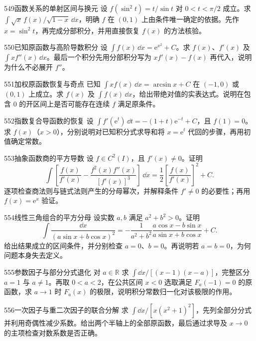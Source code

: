 \begin{exercise}{549}{函数关系的单射区间与换元}
设 $f(\sin^2t)=t/\sin t$ 对 $0<t<\pi/2$ 成立。求 $\int\sqrt x\,f(x)/\sqrt{1-x}\,\dd x$，明确 $f$ 在 $(0,1)$ 上由条件唯一确定的依据。先作 $x=\sin^2t$，再完成分部积分，并用直接恢复 $f(x)$ 的方法核验。
\end{exercise}
\begin{exercise}{550}{已知原函数与高阶导数积分}
设 $\int f(x)\,\dd x=\mathrm e^{x^2}+C$。求 $f(x)$、$f'(x)$ 及 $\int xf''(x)\,\dd x$。最后一个积分先用分部积分写为 $xf'(x)-f(x)$ 再代入，说明为什么不必展开 $f''$。
\end{exercise}
\begin{exercise}{551}{加权原函数恢复与奇点}
已知 $\int xf(x)\,\dd x=\arcsin x+C$ 在 $(-1,0)$ 或 $(0,1)$ 上成立。求 $f(x)$ 及 $\int f(x)\,\dd x$，给出带绝对值的实表达式。说明在包含 $0$ 的开区间上是否可能存在连续 $f$ 满足原条件。
\end{exercise}
\begin{exercise}{552}{指数复合导函数的恢复}
设 $\int f'(\mathrm e^t)\,\dd t=-(1+t)\mathrm e^{-t}+C$，且 $f(1)=0$。求 $f(x)$（$x>0$），分别说明对已知积分式求导和将 $x=\mathrm e^t$ 代回的步骤，再用初值确定常数。
\end{exercise}
\begin{exercise}{553}{抽象函数商的平方导数}
设 $f\in C^2(I)$，且 $f'(x)\ne0$。证明
\[\int\left[\frac{f(x)}{f'(x)}-\frac{f^2(x)f''(x)}{[f'(x)]^3}\right]\,\dd x=\frac12\left[\frac{f(x)}{f'(x)}\right]^2+C.\]
逐项检查商法则与链式法则产生的分母幂次，并解释条件 $f'\ne0$ 的必要性；再用 $f(x)=\mathrm e^x$ 验证。
\end{exercise}
\begin{exercise}{554}{线性三角组合的平方分母}
设实数 $a,b$ 满足 $a^2+b^2>0$。证明
\[\int\frac{\dd x}{(a\sin x+b\cos x)^2}=-\frac1{a^2+b^2}\frac{a\cos x-b\sin x}{a\sin x+b\cos x}+C.\]
给出结果成立的区间条件，并分别检查 $a=0$、$b=0$。再说明若 $a=b=0$，为何问题本身失去定义。
\end{exercise}
\begin{exercise}{555}{参数因子与部分分式退化}
对 $a\in\mathbb R$ 求 $\int\dd x/[(x-1)(x-a)]$，完整区分 $a=1$ 与 $a\ne1$。再取 $0<a<2$，在公共区间 $x<0$ 选取满足 $F_a(-1)=0$ 的原函数，求 $a\to1$ 时 $F_a(x)$ 的极限，说明积分常数归一化对该极限的作用。
\end{exercise}
\begin{exercise}{556}{一次因子与重二次因子的联合分解}
求 $\int\dd x/[x(x^2+1)^2]$，先列全部分分式并利用奇偶性减少系数。给出两个半轴上的全部原函数，最后通过求导及 $x\to0$ 的主项检查对数系数是否正确。
\end{exercise}
